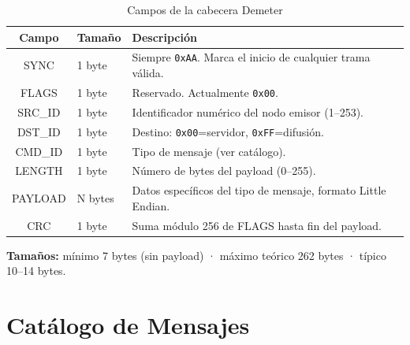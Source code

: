 \begin{table}[H]
    \centering
    \caption{Campos de la cabecera Demeter}
    \begin{tabular}{clp{8cm}}
        \toprule
        \textbf{Campo}  & \textbf{Tamaño} & \textbf{Descripción} \\
        \midrule
        SYNC    & 1 byte & Siempre \texttt{0xAA}. Marca el inicio de cualquier trama válida. \\
        FLAGS   & 1 byte & Reservado. Actualmente \texttt{0x00}. \\
        SRC\_ID & 1 byte & Identificador numérico del nodo emisor (1--253). \\
        DST\_ID & 1 byte & Destino: \texttt{0x00}=servidor, \texttt{0xFF}=difusión. \\
        CMD\_ID & 1 byte & Tipo de mensaje (ver catálogo). \\
        LENGTH  & 1 byte & Número de bytes del payload (0--255). \\
        PAYLOAD & N bytes & Datos específicos del tipo de mensaje, formato Little Endian. \\
        CRC     & 1 byte & Suma módulo 256 de FLAGS hasta fin del payload. \\
        \bottomrule
    \end{tabular}
    \label{tab:cabecera_demeter}
\end{table}

\textbf{Tamaños:} mínimo 7 bytes (sin payload) · máximo teórico 262 bytes · típico 10--14 bytes.

\section{Catálogo de Mensajes}

